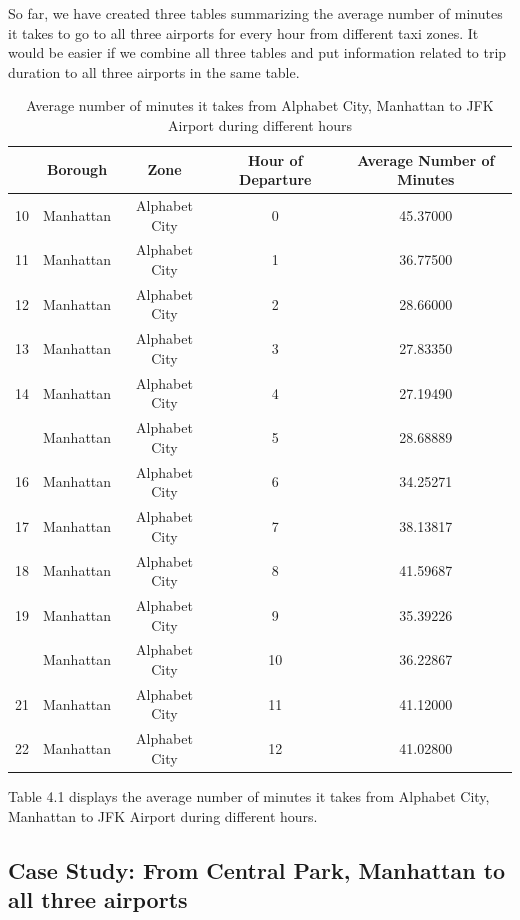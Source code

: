 \documentclass[12pt,twoside]{reedthesis}
\theoremstyle{definition}
\theoremstyle{definition}
\theoremstyle{definition}
\theoremstyle{remark}
\begin{document}
So far, we have created three tables summarizing the average number of
minutes it takes to go to all three airports for every hour from
different taxi zones. It would be easier if we combine all three tables
and put information related to trip duration to all three airports in
the same table.
\begin{table}

\caption{\label{tab:unnamed-chunk-59}Average number of minutes it takes from Alphabet City, Manhattan to JFK Airport during different hours}
\centering
\begin{tabular}[t]{lcccc}
\toprule
  & Borough & Zone & Hour of Departure & Average Number of Minutes\\
\midrule
10 & Manhattan & Alphabet City & 0 & 45.37000\\
11 & Manhattan & Alphabet City & 1 & 36.77500\\
12 & Manhattan & Alphabet City & 2 & 28.66000\\
13 & Manhattan & Alphabet City & 3 & 27.83350\\
14 & Manhattan & Alphabet City & 4 & 27.19490\\
\addlinespace
15 & Manhattan & Alphabet City & 5 & 28.68889\\
16 & Manhattan & Alphabet City & 6 & 34.25271\\
17 & Manhattan & Alphabet City & 7 & 38.13817\\
18 & Manhattan & Alphabet City & 8 & 41.59687\\
19 & Manhattan & Alphabet City & 9 & 35.39226\\
\addlinespace
20 & Manhattan & Alphabet City & 10 & 36.22867\\
21 & Manhattan & Alphabet City & 11 & 41.12000\\
22 & Manhattan & Alphabet City & 12 & 41.02800\\
\bottomrule
\end{tabular}
\end{table}
Table 4.1 displays the average number of minutes it takes from Alphabet
City, Manhattan to JFK Airport during different hours.

\subsection{Case Study: From Central Park, Manhattan to all three
airports}\label{case-study-from-central-park-manhattan-to-all-three-airports}
\end{document}
